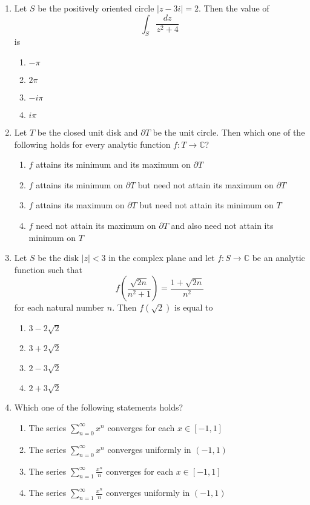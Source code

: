 \documentclass[journal]{IEEEtran}
\numberwithin{equation}{enumi}
\numberwithin{figure}{enumi}
\begin{document}
\begin{enumerate}
\item
Let $S$ be the positively oriented circle $|z-3i|=2$. Then the value of
\[
\int_S \frac{dz}{z^2 + 4}
\]
is
\hfill{}
\begin{multicols}{4}
\begin{enumerate}
    \item $-\pi$
    \item $2\pi$
    \item $-i\pi$
    \item $i\pi$
\end{enumerate}
\end{multicols}


\item
Let $T$ be the closed unit disk and $\partial T$ be the unit circle. Then which one of the following holds for every analytic function $f : T \to \mathbb{C}$?
\hfill{}
\begin{enumerate}
    \item $f$ attains its minimum and its maximum on $\partial T$
    \item $f$ attains its minimum on $\partial T$ but need not attain its maximum on $\partial T$
    \item $f$ attains its maximum on $\partial T$ but need not attain its minimum on $T$
    \item $f$ need not attain its maximum on $\partial T$ and also need not attain its minimum on $T$
\end{enumerate}

\item
Let $S$ be the disk $|z| < 3$ in the complex plane and let $f:S \to \mathbb{C}$ be an analytic function such that
\[
f\left(\frac{\sqrt{2n}}{n^2+1}\right) = \frac{1+\sqrt{2n}}{n^2}
\]
for each natural number $n$. Then $f(\sqrt{2})$ is equal to
\hfill{}
\begin{multicols}{4}
\begin{enumerate}
    \item $3 - 2\sqrt{2}$
    \item $3 + 2\sqrt{2}$
    \item $2 - 3\sqrt{2}$
    \item $2 + 3\sqrt{2}$
\end{enumerate}
\end{multicols}


\item
Which one of the following statements holds?
\hfill{}
\begin{enumerate}
    \item The series $\sum_{n=0}^{\infty} x^n$ converges for each $x \in [-1,1]$
    \item The series $\sum_{n=0}^{\infty} x^n$ converges uniformly in $(-1,1)$
    \item The series $\sum_{n=1}^{\infty} \frac{x^n}{n}$ converges for each $x \in [-1,1]$
    \item The series $\sum_{n=1}^{\infty} \frac{x^n}{n}$ converges uniformly in $(-1,1)$
\end{enumerate}


\end{enumerate}
\end{document}
